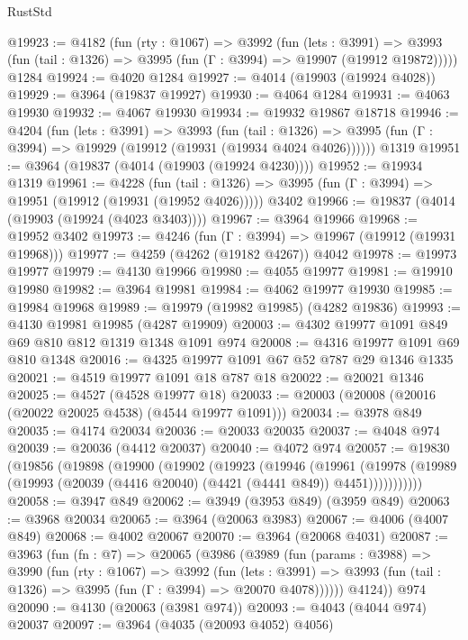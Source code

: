 \begin{lexlean}{RustStd}
\begin{coremodule}
{\begin{coremodule}
{{{{{{{{{{{{{{{{{{{{{{{{{{{{{{{{{{{{{{@19923 := @4182
    (fun (rty : @1067) =>
    @3992
      (fun (lets : @3991) =>
      @3993 (fun (tail : @1326) => @3995 (fun (Γ : @3994) => @19907 (@19912 @19872)))))
    @1284
@19924 := @4020 @1284
@19927 := @4014 (@19903 (@19924 @4028))
@19929 := @3964 (@19837 @19927)
@19930 := @4064 @1284
@19931 := @4063 @19930
@19932 := @4067 @19930
@19934 := @19932 @19867 @18718
@19946 := @4204
    (fun (lets : @3991) =>
    @3993
      (fun (tail : @1326) =>
      @3995 (fun (Γ : @3994) => @19929 (@19912 (@19931 (@19934 @4024 @4026))))))
    @1319
@19951 := @3964 (@19837 (@4014 (@19903 (@19924 @4230))))
@19952 := @19934 @1319
@19961 := @4228
    (fun (tail : @1326) => @3995 (fun (Γ : @3994) => @19951 (@19912 (@19931 (@19952 @4026)))))
    @3402
@19966 := @19837 (@4014 (@19903 (@19924 (@4023 @3403))))
@19967 := @3964 @19966
@19968 := @19952 @3402
@19973 := @4246 (fun (Γ : @3994) => @19967 (@19912 (@19931 @19968)))
@19977 := @4259 (@4262 (@19182 @4267)) @4042
@19978 := @19973 @19977
@19979 := @4130 @19966
@19980 := @4055 @19977
@19981 := @19910 @19980
@19982 := @3964 @19981
@19984 := @4062 @19977 @19930
@19985 := @19984 @19968
@19989 := @19979 (@19982 @19985) (@4282 @19836)
@19993 := @4130 @19981 @19985 (@4287 @19909)
@20003 := @4302 @19977 @1091 @849 @69 @810 @812 @1319 @1348 @1091 @974
@20008 := @4316 @19977 @1091 @69 @810 @1348
@20016 := @4325 @19977 @1091 @67 @52 @787 @29 @1346 @1335
@20021 := @4519 @19977 @1091 @18 @787 @18
@20022 := @20021 @1346
@20025 := @4527 (@4528 @19977 @18)
@20033 := @20003 (@20008 (@20016 (@20022 @20025 @4538) (@4544 @19977 @1091)))
@20034 := @3978 @849
@20035 := @4174 @20034
@20036 := @20033 @20035
@20037 := @4048 @974
@20039 := @20036 (@4412 @20037)
@20040 := @4072 @974
@20057 := @19830
    (@19856
      (@19898
        (@19900
          (@19902
            (@19923
              (@19946
                (@19961
                  (@19978
                    (@19989 (@19993 (@20039 (@4416 @20040) (@4421 (@4441 @849)) @4451)))))))))))
@20058 := @3947 @849
@20062 := @3949 (@3953 @849) (@3959 @849)
@20063 := @3968 @20034
@20065 := @3964 (@20063 @3983)
@20067 := @4006 (@4007 @849)
@20068 := @4002 @20067
@20070 := @3964 (@20068 @4031)
@20087 := @3963
    (fun (fn : @7) =>
    @20065
      (@3986
        (@3989
          (fun (params : @3988) =>
          @3990
            (fun (rty : @1067) =>
            @3992
              (fun (lets : @3991) =>
              @3993 (fun (tail : @1326) => @3995 (fun (Γ : @3994) => @20070 @4078))))))
        @4124))
    @974
@20090 := @4130 (@20063 (@3981 @974))
@20093 := @4043 (@4044 @974) @20037
@20097 := @3964 (@4035 (@20093 @4052) @4056)
}}}}}}}}}}}}}}}}}}}}}}}}}}}}}}}}}}}}}}
\end{coremodule}}
\end{coremodule}
\end{lexlean}
